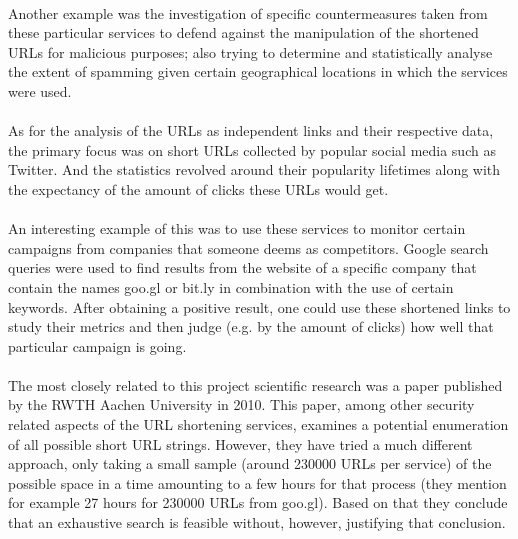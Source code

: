 \documentclass[12pt]{article}
\begin{document}
\paragraph{}
Another example was the investigation of specific countermeasures taken from these particular services to defend against the manipulation of the shortened URLs for malicious purposes; also trying to determine and statistically analyse the extent of spamming given certain geographical locations in which the services were used. \cite{web} \cite{attack}

\paragraph{}
 As for the analysis of the URLs as independent links and their respective data, the primary focus was on short URLs collected by popular social media such as Twitter. And the statistics revolved around their popularity lifetimes along with the expectancy of the amount of clicks these URLs would get. \cite{twoyears} \cite{stranger}
 
\paragraph{}
 An interesting example of this was to use these services to monitor certain campaigns from companies that someone deems as competitors. Google search queries were used to find results from the website of a specific company that contain the names goo.gl or bit.ly in combination with the use of certain keywords. After obtaining a positive result, one could use these shortened links to study their metrics and then judge (e.g. by the amount of clicks) how well that particular campaign is going.\cite{campaigns}
 
 \paragraph{}
The most closely related to this project scientific research was a paper published by the RWTH Aachen University in 2010. This paper, among other security related aspects of the URL shortening services, examines a potential enumeration of all possible short URL strings. However, they have tried a much different approach, only taking a small sample (around 230000 URLs per service) of the possible space in a time amounting to a few hours for that process (they mention for example 27 hours for 230000 URLs from goo.gl). Based on that they conclude that an exhaustive search is feasible without, however, justifying that conclusion. \cite{implications}
\end{document}
